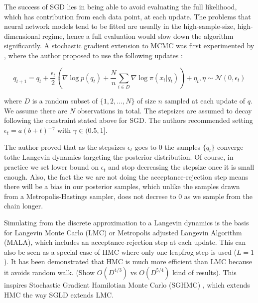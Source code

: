 \documentclass[]{report}
\begin{document}
The success of SGD lies in being able to avoid evaluating the full likelihood, which has contribution from each data point, at each update. The problems that neural network models tend to be fitted are usually in the high-sample-size, high-dimensional regime, hence a full evaluation would slow down the algorithm significantly. A stochastic gradient extension to MCMC was first experimented by \cite{welling2011bayesian}, where the author proposed to use the following updates :

\[q_{t+1} = q_t + \frac{\epsilon_t}{2} ( \nabla \log p(q_t) + \frac{N}{n} \sum_{i \in D} \nabla \log \pi(x_i|q_t) ) + \eta_t , \eta \sim \mathcal{N}(0,\epsilon_t) \]

where $D$ is a random subset of $\{1,2, \dots, N\}$ of size $n$ sampled at each update of $q$. We assume there are $N$ observations in total. The stepsizes are assumed to decay following the constraint stated above for SGD. The authors recommended setting $\epsilon_t = a(b+t)^{-\gamma} $ with $\gamma \in (0.5,1]$.  

The author proved that as the stepsizes $\epsilon_t$ goes to $0$ the samples $\{q_t\}$ converge tothe Langevin dynamics targeting the posterior distribution. Of course, in practice we set lower bound on $\epsilon_t$ and stop decreasing the stepsize once it is small enough. Also, the fact the we are not doing the acceptance-rejection step means there will be a bias in our posterior samples, which unlike the samples drawn from a Metropolis-Hastings sampler, does not decrese to $0$ as we sample from the chain longer.



Simulating from the discrete approximation to a Langevin dynamics is the basis
for Langevin Monte Carlo (LMC) or Metropolis adjusted Langevin Algorithm (MALA), which
includes an acceptance-rejection step at each update. This can also be seen as a
special case of HMC where only one leapfrog step is used ($L=1$). It has been
demonstrated that HMC is much more efficient than LMC because it avoids random
walk. (Show $O(D^{4/3})$ vs $O(D^{5/4})$ kind of results). This inspires
Stochastic Gradient Hamilotian Monte Carlo (SGHMC) ,
which extends HMC the way SGLD extends LMC. 
\end{document}
